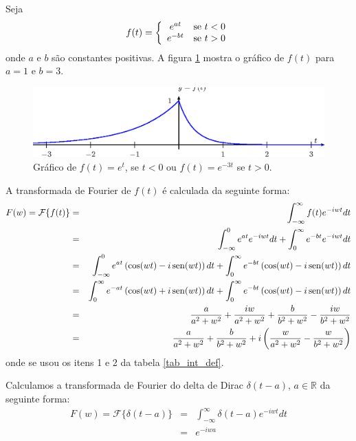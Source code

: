 \begin{ex} Seja 
$$f(t)=\left\{\begin{array}{cc}e^{at}&\hbox{se}\ t<0\\
e^{-bt}&\hbox{se}\ t>0
\end{array}\right.
$$
onde $a$ e $b$ são constantes positivas. A figura \ref{fig_trans_1} mostra o gráfico de $f(t)$ para $a=1$ e $b=3$.
\begin{figure}[!ht]
\begin{center}

\includegraphics{cap_transformada_de_fourier/pics/figura_7}\end{center}
\caption{\label{fig_trans_1} Gráfico de $f(t)=e^{t}$, se $t<0$ ou $f(t)=e^{-3t}$ se $t>0$.  }
\end{figure}
A transformada de Fourier de $f(t)$ é calculada da seguinte forma:
\begin{eqnarray*}
F(w)=\mathcal{F}\{f(t)\}&=&\int_{-\infty}^\infty f(t) e^{-i w t}dt\\
&=&\int_{-\infty}^0 e^{at} e^{-i w t}dt+\int_{0}^\infty e^{-bt} e^{-i w t}dt\\
&=&\int_{-\infty}^0 e^{at} \left(\cos(wt)-i\operatorname{sen}(wt)\right)dt+\int_{0}^\infty e^{-bt} \left(\cos(wt)-i\operatorname{sen}(wt)\right)dt\\
&=&\int_{0}^\infty e^{-at} \left(\cos(wt)+i\operatorname{sen}(wt)\right)dt+\int_{0}^\infty e^{-bt} \left(\cos(wt)-i\operatorname{sen}(wt)\right)dt\\
&=&\frac{a}{a^2+w^2}+\frac{iw}{a^2+w^2}+\frac{b}{b^2+w^2}-\frac{iw}{b^2+w^2}\\
&=&\frac{a}{a^2+w^2}+\frac{b}{b^2+w^2}+i\left(\frac{w}{a^2+w^2}-\frac{w}{b^2+w^2}\right)
\end{eqnarray*}
onde se usou os itens 1 e 2 da tabela \ref{tab_int_def}.
\end{ex}
\begin{ex} Calculamos a transformada de Fourier do delta de Dirac $\delta(t-a)$, $a\in\mathbb{R}$ da seguinte forma:
\begin{eqnarray*}
F(w)=\mathcal{F}\{\delta(t-a)\}&=&\int_{-\infty}^\infty \delta(t-a) e^{-i w t}dt\\
&=&e^{-i w a}
\end{eqnarray*}
\end{ex}

